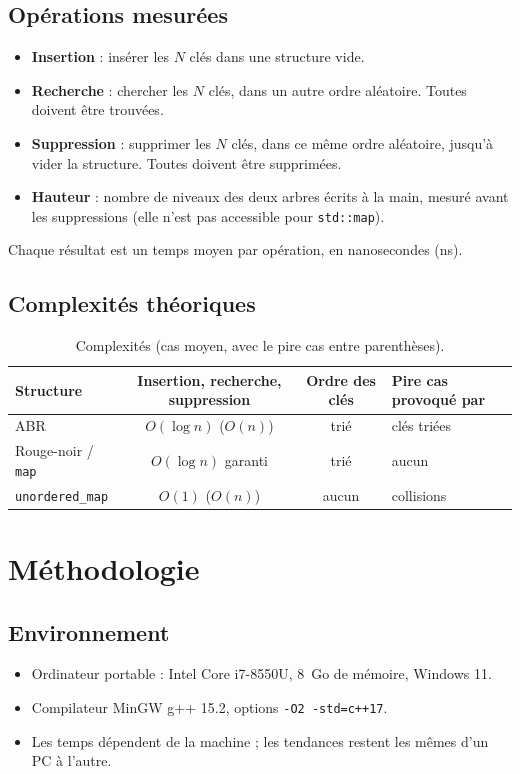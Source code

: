 \documentclass[12pt,a4paper]{report}
\begin{document}
\section{Opérations mesurées}
\begin{itemize}
  \item \textbf{Insertion} : insérer les $N$ clés dans une structure vide.
  \item \textbf{Recherche} : chercher les $N$ clés, dans un autre ordre aléatoire. Toutes doivent être trouvées.
  \item \textbf{Suppression} : supprimer les $N$ clés, dans ce même ordre aléatoire, jusqu'à vider la structure. Toutes doivent être supprimées.
  \item \textbf{Hauteur} : nombre de niveaux des deux arbres écrits à la main, mesuré avant les suppressions (elle n'est pas accessible pour \texttt{std::map}).
\end{itemize}
Chaque résultat est un temps moyen par opération, en nanosecondes (ns).

\section{Complexités théoriques}
\begin{table}[H]
\centering
\caption{Complexités (cas moyen, avec le pire cas entre parenthèses).}
\small
\setlength{\tabcolsep}{4pt}
\begin{tabular}{lccl}
  \toprule
  Structure & Insertion, recherche, suppression & Ordre des clés & Pire cas provoqué par \\
  \midrule
  ABR & $O(\log n)$ \quad ($O(n)$) & trié & clés triées \\
  Rouge-noir / \texttt{map} & $O(\log n)$ garanti & trié & aucun \\
  \texttt{unordered\_map} & $O(1)$ \quad ($O(n)$) & aucun & collisions \\
  \bottomrule
\end{tabular}
\end{table}

\chapter{Méthodologie}

\section{Environnement}
\begin{itemize}
  \item Ordinateur portable : Intel Core i7-8550U, 8~Go de mémoire, Windows 11.
  \item Compilateur MinGW g++ 15.2, options \texttt{-O2 -std=c++17}.
  \item Les temps dépendent de la machine ; les tendances restent les mêmes d'un PC à l'autre.
\end{itemize}
\end{document}
